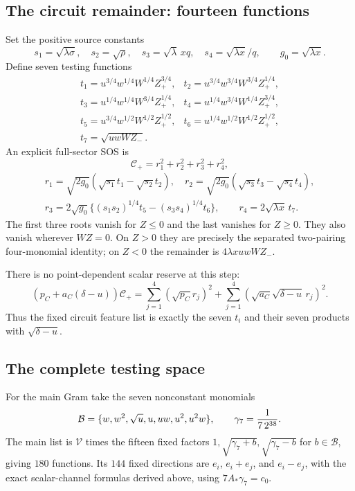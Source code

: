 \documentclass[11pt]{article}
\begin{document}
\subsection{The circuit remainder: fourteen functions}

Set the positive source constants
\[
 s_1=\sqrt{\lambda\sigma},\quad s_2=\sqrt\rho,\quad
 s_3=\sqrt\lambda\,xq,\quad s_4=\sqrt{\lambda x}/q,
 \qquad g_0=\sqrt{\lambda x}.
\]
Define seven testing functions
\[
\begin{array}{ll}
 t_1=u^{3/4}w^{1/4}W^{1/4}Z_+^{3/4},&
 t_2=u^{3/4}w^{3/4}W^{3/4}Z_+^{1/4},\\
 t_3=u^{1/4}w^{1/4}W^{3/4}Z_+^{1/4},&
 t_4=u^{1/4}w^{3/4}W^{1/4}Z_+^{3/4},\\
 t_5=u^{3/4}w^{1/2}W^{1/2}Z_+^{1/2},&
 t_6=u^{1/4}w^{1/2}W^{1/2}Z_+^{1/2},\\
 t_7=\sqrt{uwWZ_-}.&
\end{array}
\]
An explicit full-sector SOS is
\[
 \mathscr C_+=r_1^2+r_2^2+r_3^2+r_4^2,
\]
\[
\begin{gathered}
 r_1=\sqrt{2g_0}(\sqrt{s_1}t_1-\sqrt{s_2}t_2),\quad
 r_2=\sqrt{2g_0}(\sqrt{s_3}t_3-\sqrt{s_4}t_4),\\
 r_3=2\sqrt{g_0}\{(s_1s_2)^{1/4}t_5-(s_3s_4)^{1/4}t_6\},
 \qquad r_4=2\sqrt{\lambda x}\,t_7.
\end{gathered}
\]
The first three roots vanish for $Z\le0$ and the last vanishes
for $Z\ge0$. They also vanish wherever $WZ=0$. On $Z>0$ they
are precisely the separated two-pairing four-monomial identity;
on $Z<0$ the remainder is $4\lambda xuwWZ_-$.

There is no point-dependent scalar reserve at this step:
\[
 (p_C+a_C(\delta-u))\mathscr C_+
      =\sum_{j=1}^4(\sqrt{p_C}r_j)^2
        +\sum_{j=1}^4(\sqrt{a_C}\sqrt{\delta-u}\,r_j)^2.
\]
Thus the fixed circuit feature list is exactly the seven $t_i$
and their seven products with $\sqrt{\delta-u}$.

\subsection{The complete testing space}

For the main Gram take the seven nonconstant monomials
\[
 \mathcal B=\{w,w^2,\sqrt u,u,uw,u^2,u^2w\},\qquad
 \gamma_7={1\over7\,2^{38}}.
\]
The main list is $\mathcal V$ times the fifteen fixed factors
$1,\sqrt{\gamma_7+b},\sqrt{\gamma_7-b}$ for $b\in\mathcal B$,
giving $180$ functions. Its $144$ fixed directions are $e_i$,
$e_i+e_j$, and $e_i-e_j$, with the exact scalar-channel formulas
derived above, using $7A_*\gamma_7=c_0$.
\end{document}
